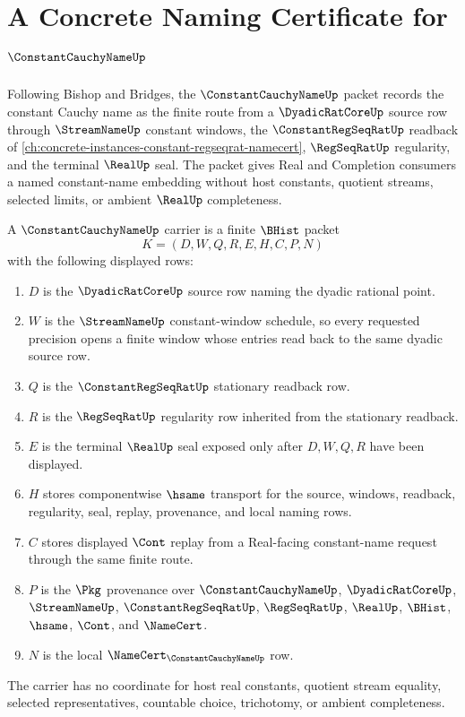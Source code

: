 \chapter{A Concrete Naming Certificate for $\ConstantCauchyNameUp$}
\label{ch:concrete-instances-constant-cauchy-name-namecert}

Following Bishop and Bridges, the $\ConstantCauchyNameUp$ packet records the constant Cauchy name as the finite route from a $\DyadicRatCoreUp$ source row through $\StreamNameUp$ constant windows, the $\ConstantRegSeqRatUp$ readback of \autoref{ch:concrete-instances-constant-regseqrat-namecert}, $\RegSeqRatUp$ regularity, and the terminal $\RealUp$ seal. The packet gives Real and Completion consumers a named constant-name embedding without host constants, quotient streams, selected limits, or ambient $\RealUp$ completeness.

\begin{definition}
\label{def:constant-cauchy-name-carrier}
A $\ConstantCauchyNameUp$ carrier is a finite $\BHist$ packet
$$
K=(D,W,Q,R,E,H,C,P,N)
$$
with the following displayed rows:
\begin{enumerate}
\item $D$ is the $\DyadicRatCoreUp$ source row naming the dyadic rational point.
\item $W$ is the $\StreamNameUp$ constant-window schedule, so every requested precision opens a finite window whose entries read back to the same dyadic source row.
\item $Q$ is the $\ConstantRegSeqRatUp$ stationary readback row.
\item $R$ is the $\RegSeqRatUp$ regularity row inherited from the stationary readback.
\item $E$ is the terminal $\RealUp$ seal exposed only after $D,W,Q,R$ have been displayed.
\item $H$ stores componentwise $\hsame$ transport for the source, windows, readback, regularity, seal, replay, provenance, and local naming rows.
\item $C$ stores displayed $\Cont$ replay from a Real-facing constant-name request through the same finite route.
\item $P$ is the $\Pkg$ provenance over $\ConstantCauchyNameUp$, $\DyadicRatCoreUp$, $\StreamNameUp$, $\ConstantRegSeqRatUp$, $\RegSeqRatUp$, $\RealUp$, $\BHist$, $\hsame$, $\Cont$, and $\NameCert$.
\item $N$ is the local $\NameCert_{\ConstantCauchyNameUp}$ row.
\end{enumerate}
The carrier has no coordinate for host real constants, quotient stream equality, selected representatives, countable choice, trichotomy, or ambient completeness.
\end{definition}

